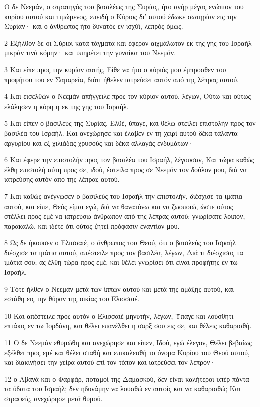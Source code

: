 \par Ο δε Νεεμάν, ο στρατηγός του βασιλέως της Συρίας, ήτο ανήρ μέγας ενώπιον του κυρίου αυτού και τιμώμενος, επειδή ο Κύριος δι' αυτού έδωκε σωτηρίαν εις την Συρίαν· και ο άνθρωπος ήτο δυνατός εν ισχύϊ, λεπρός όμως.
\par 2 Εξήλθον δε οι Σύριοι κατά τάγματα και έφερον αιχμάλωτον εκ της γης του Ισραήλ μικράν τινά κόρην· και υπηρέτει την γυναίκα του Νεεμάν.
\par 3 Και είπε προς την κυρίαν αυτής, Είθε να ήτο ο κύριός μου έμπροσθεν του προφήτου του εν Σαμαρεία, διότι ήθελεν ιατρεύσει αυτόν από της λέπρας αυτού.
\par 4 Και εισελθών ο Νεεμάν απήγγειλε προς τον κύριον αυτού, λέγων, Ούτω και ούτως ελάλησεν η κόρη η εκ της γης του Ισραήλ.
\par 5 Και είπεν ο βασιλεύς της Συρίας, Ελθέ, ύπαγε, και θέλω στείλει επιστολήν προς τον βασιλέα του Ισραήλ. Και ανεχώρησε και έλαβεν εν τη χειρί αυτού δέκα τάλαντα αργυρίου και εξ χιλιάδας χρυσούς και δέκα αλλαγάς ενδυμάτων·
\par 6 Και έφερε την επιστολήν προς τον βασιλέα του Ισραήλ, λέγουσαν, Και τώρα καθώς έλθη επιστολή αύτη προς σε, ιδού, έστειλα προς σε Νεεμάν τον δούλον μου, διά να ιατρεύσης αυτόν από της λέπρας αυτού.
\par 7 Και καθώς ανέγνωσεν ο βασιλεύς του Ισραήλ την επιστολήν, διέσχισε τα ιμάτια αυτού, και είπε, Θεός είμαι εγώ, διά να θανατόνω και να ζωοποιώ, ώστε ούτος στέλλει προς εμέ να ιατρεύσω άνθρωπον από της λέπρας αυτού; γνωρίσατε λοιπόν, παρακαλώ, και ιδέτε ότι ούτος ζητεί πρόφασιν εναντίον μου.
\par 8 Ως δε ήκουσεν ο Ελισσαιέ, ο άνθρωπος του Θεού, ότι ο βασιλεύς του Ισραήλ διέσχισε τα ιμάτια αυτού, απέστειλε προς τον βασιλέα, λέγων, Διά τι διέσχισας τα ιμάτιά σου; ας έλθη τώρα προς εμέ, και θέλει γνωρίσει ότι είναι προφήτης εν τω Ισραήλ.
\par 9 Τότε ήλθεν ο Νεεμάν μετά των ίππων αυτού και μετά της αμάξης αυτού, και εστάθη εις την θύραν της οικίας του Ελισσαιέ.
\par 10 Και απέστειλε προς αυτόν ο Ελισσαιέ μηνυτήν, λέγων, Ύπαγε και λούσθητι επτάκις εν τω Ιορδάνη, και θέλει επανέλθει η σαρξ σου εις σε, και θέλεις καθαρισθή.
\par 11 Ο δε Νεεμάν εθυμώθη και ανεχώρησε και είπεν, Ιδού, εγώ έλεγον, Θέλει βεβαίως εξέλθει προς εμέ και θέλει σταθή και επικαλεσθή το όνομα Κυρίου του Θεού αυτού, και διακινήσει την χείρα αυτού επί τον τόπον και ιατρεύσει τον λεπρόν·
\par 12 ο Αβανά και ο Φαρφάρ, ποταμοί της Δαμασκού, δεν είναι καλήτεροι υπέρ πάντα τα ύδατα του Ισραήλ; δεν ηδυνάμην να λουσθώ εν αυτοίς και να καθαρισθώ; Και στραφείς, ανεχώρησε μετά θυμού.
